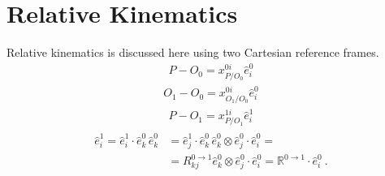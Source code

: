 \documentclass[letterpaper,10pt,english]{jupyterBook}
\begin{document}
\section{Relative Kinematics}
\label{\detokenize{ch/kinematics-relative:relative-kinematics}}\label{\detokenize{ch/kinematics-relative:classical-mechanics-kinematics-relative}}\label{\detokenize{ch/kinematics-relative::doc}}
\sphinxAtStartPar
Relative kinematics is discussed here using two Cartesian reference frames.
\begin{equation*}
\begin{split}P   - O_0 = x^{0i}_{  P/O_0} \hat{e}^0_i\end{split}
\end{equation*}\begin{equation*}
\begin{split}O_1 - O_0 = x^{0i}_{O_1/O_0} \hat{e}^0_i\end{split}
\end{equation*}\begin{equation*}
\begin{split}P   - O_1 = x^{1i}_{  P/O_1} \hat{e}^1_i\end{split}
\end{equation*}\begin{equation*}
\begin{split}\begin{aligned}
  \hat{e}^1_i 
  = \hat{e}^{1}_i \cdot \hat{e}^0_k \, \hat{e}^0_k
  & = \hat{e}^{1}_j \cdot \hat{e}^0_k \, \hat{e}^0_k \otimes \hat{e}^0_j \cdot \hat{e}^0_i = \\
  & = R^{0\rightarrow 1}_{kj} \hat{e}^0_k \otimes \hat{e}^0_j \cdot \hat{e}^0_i 
    = \mathbb{R}^{0\rightarrow 1} \cdot \hat{e}^0_i  \ .
\end{aligned}\end{split}
\end{equation*}
\end{document}
